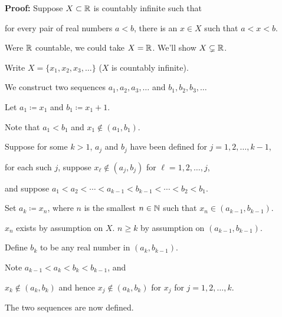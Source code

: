 \documentclass[10pt,aspectratio=169]{beamer}
\begin{document}
\begin{frame}
\textbf{Proof:}
Suppose $X \subset {\mathbb{R}}$ is countably infinite such that

for every pair of real numbers $a < b$, there is an $x \in X$ such that
$a < x < b$.

\pause

Were ${\mathbb{R}}$ countable, we could take $X={\mathbb{R}}$.  \qquad We'll show $X \subsetneq {\mathbb{R}}$.

\medskip
\pause

Write $X = \{ x_1, x_2, x_3, \ldots \}$ \quad ($X$ is countably infinite).

\pause
We construct two sequences
$a_1,a_2,a_3,\ldots$ and
$b_1,b_2,b_3,\ldots$

\pause
Let $a_1 \coloneqq x_1$ and $b_1 \coloneqq x_1+1$.

\pause
Note that $a_1 < b_1$ and $x_1 \notin (a_1,b_1)$.

\pause
Suppose for some $k > 1$, 
$a_{j}$ and $b_{j}$ have been defined for $j=1,2,\ldots,k-1$,

\pause
for each such $j$, suppose $x_\ell \notin (a_{j},b_{j})$ for $\ell=1,2,\ldots,j$,

\pause
and suppose
$a_1 < a_2 < \cdots < a_{k-1} < b_{k-1} < \cdots < b_2 < b_1$.

\medskip
\pause

Set $a_k \coloneqq x_n$, where $n$ is the smallest $n \in {\mathbb{N}}$
such that $x_n \in (a_{k-1},b_{k-1})$.

\pause
$x_n$ exists by assumption on $X$.
\quad $n \geq k$ by assumption on $(a_{k-1},b_{k-1})$.

\pause
Define $b_k$ to be any real number in $(a_k,b_{k-1})$.

\medskip
\pause

Note $a_{k-1} < a_k < b_k < b_{k-1}$, and

\pause
$x_k \notin (a_{k},b_{k})$ and hence
$x_j \notin (a_{k},b_{k})$ 
for $x_j$ for $j=1,2,\ldots,k$.

\pause
The two sequences are now defined.

\end{frame}
\end{document}
